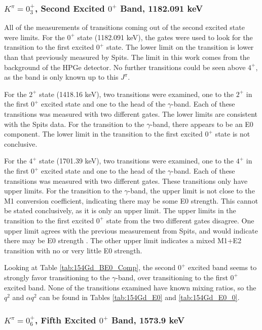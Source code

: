 \subsubsection{$K^{\pi}=0^+_3$, Second Excited $0^+$ Band, 1182.091 keV}

All of the measurements of transitions coming out of the second excited state were limits. For the $0^+$ state (1182.091 keV), the gates were used to look for the transition to the first excited $0^+$ state. The lower limit on the transition is lower than that previously measured by Spits. The limit in this work comes from the background of the HPGe detector. No further transitions could be seen above $4^+$, as the band is only known up to this $J^{\pi}$.

For the $2^+$ state (1418.16 keV), two transitions were examined, one to the $2^+$ in the first $0^+$ excited state and one to the head of the $\gamma$-band. Each of these transitions was measured with two different gates. The lower limits are consistent with the Spits data. For the transition to the $\gamma$-band, there appears to be an E0 component. The lower limit in the transition to the first excited $0^+$ state is not conclusive.

For the $4^+$ state (1701.39 keV), two transitions were examined, one to the $4^+$ in the first $0^+$ excited state and one to the head of the $\gamma$-band. Each of these transitions was measured with two different gates. These transitions only have upper limits. For the transition to the $\gamma$-band, the upper limit is not close to the M1 conversion coefficient, indicating there may be some E0 strength. This cannot be stated conclusively, as it is only an upper limit. The upper limits in the transition to the first excited $0^+$ state from the two different gates disagree. One upper limit agrees with the previous measurement from Spits, and would indicate there may be E0 strength \citep{spits96:_154gd}. The other upper limit indicates a mixed M1+E2 transition with no or very little E0 strength.

Looking at Table \ref{tab:154Gd_BE0_Comp}, the second $0^+$ excited band seems to strongly favor transitioning to the $\gamma$-band, over transitioning to the first $0^+$ excited band. None of the transitions examined have known mixing ratios, so the $q^2$ and $\alpha q^2$ can be found in Tables \ref{tab:154Gd_E0} and \ref{tab:154Gd_E0_0}. 

\subsubsection{$K^{\pi}=0^+_6$, Fifth Excited $0^+$ Band, 1573.9 keV}


